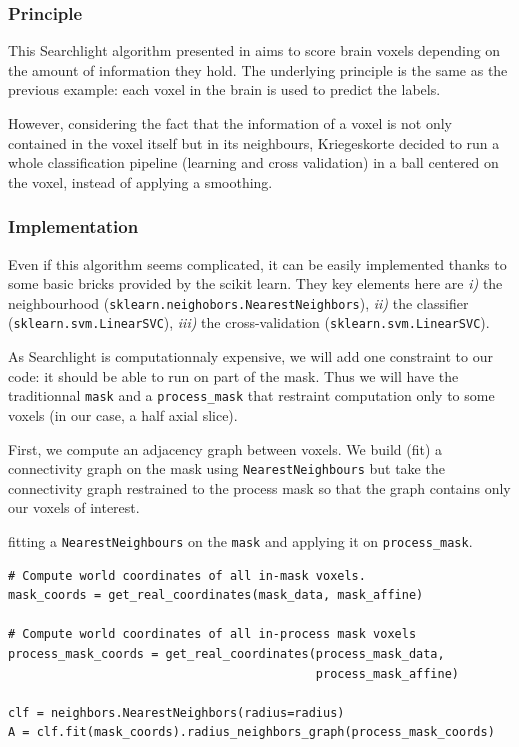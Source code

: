 \documentclass{frontiersSCNS} %
\begin{document}
\subsubsection{Principle}

This Searchlight algorithm presented in \cite{kriegeskorte2006} aims to score
brain voxels depending on the amount of information they hold. The underlying
principle is the same as the previous example: each voxel in the brain is used
to predict the labels.

However, considering the fact that the information of a voxel is not only
contained in the voxel itself but in its neighbours, Kriegeskorte decided to run
a whole classification pipeline (learning and cross validation) in a ball
centered on the voxel, instead of applying a smoothing.

\subsubsection{Implementation}

Even if this algorithm seems complicated, it can be easily implemented thanks to
some basic bricks provided by the scikit learn. They key elements here are
\textit{i)} the neighbourhood (\verb!sklearn.neighobors.NearestNeighbors!),
\textit{ii)} the classifier (\verb!sklearn.svm.LinearSVC!),
\textit{iii)} the cross-validation (\verb!sklearn.svm.LinearSVC!).

As Searchlight is computationnaly expensive, we will add one constraint to our
code: it should be able to run on part of the mask. Thus we will have the
traditionnal \verb!mask! and a \verb!process_mask! that restraint computation
only to some voxels (in our case, a half axial slice).

First, we compute an adjacency graph between voxels. 
We build (fit) a connectivity graph on the mask using \texttt{NearestNeighbours}
but take the connectivity graph restrained to the
process mask so that the graph contains only our voxels of interest.

fitting a \verb!NearestNeighbours! on the \verb!mask! and applying it on
\verb!process_mask!.

\begin{lstlisting}
# Compute world coordinates of all in-mask voxels.
mask_coords = get_real_coordinates(mask_data, mask_affine)

# Compute world coordinates of all in-process mask voxels
process_mask_coords = get_real_coordinates(process_mask_data,
                                           process_mask_affine)

clf = neighbors.NearestNeighbors(radius=radius)
A = clf.fit(mask_coords).radius_neighbors_graph(process_mask_coords)
\end{lstlisting}
\end{document}
